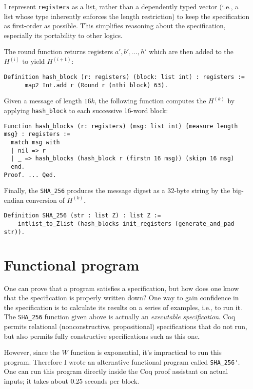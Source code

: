 \documentclass[prodmode,acmtoplas]{acmsmall}
\begin{document}
I represent \lstinline{registers} as a list, rather
than a dependently typed vector (i.e., a list whose
type inherently enforces the length restriction)
to keep the specification as first-order as possible.
This simplifies reasoning about the specification,
especially its portability to other logics.

The round function returns registers
$a',b',\ldots,h'$ which are then added 
to the $H^{(i)}$ to yield $H^{(i+1)}$:

\begin{lstlisting}
Definition hash_block (r: registers) (block: list int) : registers :=
      map2 Int.add r (Round r (nthi block) 63).
\end{lstlisting}

Given a message of length $16k$, the following function
computes the $H^{(k)}$ by applying 
\lstinline{hash_block} to each successive 
16-word block:
\begin{lstlisting}
Function hash_blocks (r: registers) (msg: list int) {measure length msg} : registers :=
  match msg with
  | nil => r
  | _ => hash_blocks (hash_block r (firstn 16 msg)) (skipn 16 msg)
  end.
Proof. ... Qed.
\end{lstlisting}

Finally, the \lstinline{SHA_256} produces the message digest
as a 32-byte string by the big-endian conversion of $H^{(k)}$.

\begin{lstlisting}
Definition SHA_256 (str : list Z) : list Z :=
    intlist_to_Zlist (hash_blocks init_registers (generate_and_pad str)).
\end{lstlisting}

\section{Functional program}
One can prove that a program satisfies a specification,
but how does one know that the specification 
is properly written down?  One way to gain confidence
in the specification is to calculate its results
on a series of examples, i.e., to run it.
The \lstinline{SHA_256} function given above
is actually an \emph{executable specification}.
Coq permits relational (nonconstructive, propositional) 
specifications that do not run, but also permits
fully constructive specifications such as this one.

However, since the $W$ function is exponential,
it's impractical to run this program.  
Therefore I wrote an alternative functional program
called \lstinline{SHA_256'}.
One can run this program directly inside the Coq 
proof assistant on actual inputs; it takes about
0.25 seconds per block.
\end{document}
